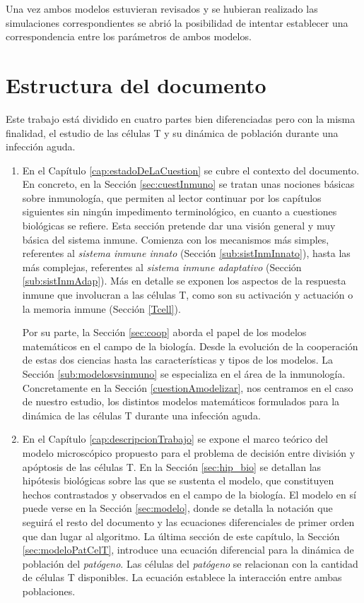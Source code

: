 Una vez ambos modelos estuvieran revisados y se hubieran realizado las simulaciones correspondientes se abrió la posibilidad de intentar establecer una correspondencia entre los parámetros de ambos modelos. 


\section{Estructura del documento}

Este trabajo está dividido en cuatro partes bien diferenciadas pero con la misma finalidad, el estudio de las células T y su dinámica de población durante una infección aguda. 

\begin{enumerate}
	\item En el Capítulo \ref{cap:estadoDeLaCuestion} se cubre el contexto del documento. En concreto, en la Sección \ref{sec:cuestInmuno} se tratan unas nociones básicas sobre inmunología, que permiten al lector continuar por los capítulos siguientes sin ningún impedimento terminológico, en cuanto a cuestiones biológicas se refiere. Esta sección pretende dar una visión general y muy básica del sistema inmune. Comienza con los mecanismos más simples, referentes al \textit{sistema inmune innato} (Sección \ref{sub:sistInmInnato}), hasta las más complejas, referentes al \textit{sistema inmune adaptativo} (Sección \ref{sub:sistInmAdap}). Más en detalle se exponen los aspectos de la respuesta inmune que involucran a las células T, como son su activación y actuación o la memoria inmune (Sección \ref{Tcell}). 
	
	Por su parte, la Sección \ref{sec:coop} aborda el papel de los modelos matemáticos en el campo de la biología. Desde la evolución de la cooperación de estas dos ciencias hasta las características y tipos de los modelos. La Sección \ref{sub:modelosvsinmuno} se especializa en el área de la inmunología. Concretamente en la Sección \ref{cuestionAmodelizar}, nos centramos en el caso de nuestro estudio, los distintos modelos matemáticos formulados para la dinámica de las células T durante una infección aguda.
	 
	
	\item En el Capítulo \ref{cap:descripcionTrabajo} se expone el marco teórico del modelo microscópico propuesto para el problema de decisión entre división y apóptosis de las células T. En la Sección \ref{sec:hip_bio} se detallan las hipótesis biológicas sobre las que se sustenta el modelo, que constituyen hechos contrastados y observados en el campo de la biología. El modelo en sí puede verse en la Sección \ref{sec:modelo}, donde se detalla la notación que seguirá el resto del documento y las ecuaciones diferenciales de primer orden que dan lugar al algoritmo. La última sección de este capítulo, la Sección \ref{sec:modeloPatCelT}, introduce una ecuación diferencial para la dinámica de población del \textit{patógeno}. Las células del \textit{patógeno} se relacionan con la cantidad de células T disponibles. La ecuación establece la interacción entre ambas poblaciones.
	

\end{enumerate}
